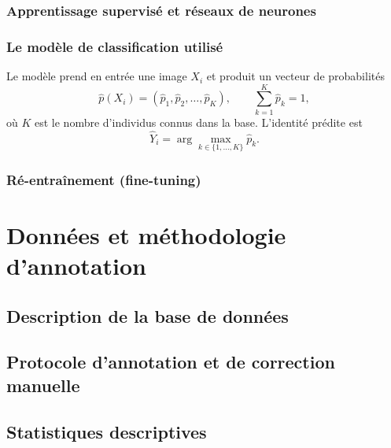 \documentclass[11pt,a4paper]{report}
\begin{document}
\subsection{Apprentissage supervisé et réseaux de neurones}

\subsection{Le modèle de classification utilisé}

Le modèle prend en entrée une image $X_i$ et produit un vecteur de probabilités
\begin{equation}
    \hat{p}(X_i) = (\hat{p}_1, \hat{p}_2, \dots, \hat{p}_K), \qquad \sum_{k=1}^{K} \hat{p}_k = 1,
\end{equation}
où $K$ est le nombre d'individus connus dans la base. L'identité prédite est
\begin{equation}
    \hat{Y}_i = \arg\max_{k \in \{1,\dots,K\}} \hat{p}_k.
\end{equation}

\subsection{Ré-entraînement (fine-tuning)}


\chapter{Données et méthodologie d'annotation}

\section{Description de la base de données}

\section{Protocole d'annotation et de correction manuelle}

\section{Statistiques descriptives}
\end{document}
